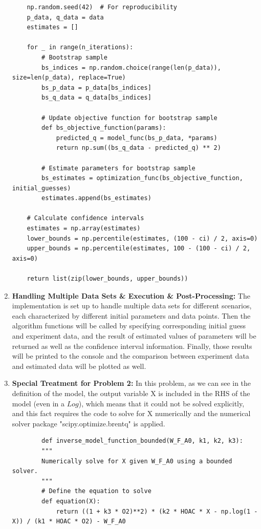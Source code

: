 \documentclass[12pt]{article} %
\begin{document}
\begin{enumerate}
\begin{lstlisting}
    np.random.seed(42)  # For reproducibility
    p_data, q_data = data
    estimates = []

    for _ in range(n_iterations):
        # Bootstrap sample
        bs_indices = np.random.choice(range(len(p_data)), size=len(p_data), replace=True)
        bs_p_data = p_data[bs_indices]
        bs_q_data = q_data[bs_indices]
        
        # Update objective function for bootstrap sample
        def bs_objective_function(params):
            predicted_q = model_func(bs_p_data, *params)
            return np.sum((bs_q_data - predicted_q) ** 2)
        
        # Estimate parameters for bootstrap sample
        bs_estimates = optimization_func(bs_objective_function, initial_guesses)
        estimates.append(bs_estimates)
    
    # Calculate confidence intervals
    estimates = np.array(estimates)
    lower_bounds = np.percentile(estimates, (100 - ci) / 2, axis=0)
    upper_bounds = np.percentile(estimates, 100 - (100 - ci) / 2, axis=0)
    
    return list(zip(lower_bounds, upper_bounds))
    \end{lstlisting}
    \item \textbf{Handling Multiple Data Sets \& Execution \& Post-Processing:}
    The implementation is set up to handle multiple data sets for different scenarios, each characterized by different initial parameters and data points. Then the algorithm functions will be called
    by specifying corresponding initial guess and experiment data, and the result of estimated values of parameters will be returned as well as the confidence interval information. Finally, those results will be 
    printed to the console and the comparison between experiment data and estimated data will be plotted as well.
    \item \textbf{Special Treatment for Problem 2:}
    In this problem, as we can see in the definition of the model, the output variable X is included in the RHS of the model (even in a $Log$), which
    means that it could not be solved explicitly, and this fact requires the code to solve for X numerically and the numerical solver package
    "scipy.optimize.brentq" is applied. 
    \begin{lstlisting}
        def inverse_model_function_bounded(W_F_A0, k1, k2, k3):
        """
        Numerically solve for X given W_F_A0 using a bounded solver.
        """
        # Define the equation to solve
        def equation(X):
            return ((1 + k3 * O2)**2) * (k2 * HOAC * X - np.log(1 - X)) / (k1 * HOAC * O2) - W_F_A0
        

\end{lstlisting}
\end{enumerate}
\end{document}
